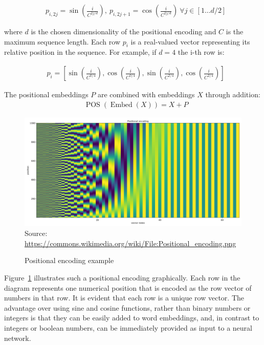 \begin{align}
&p_{i, 2j} = \sin \left( \frac{i}{C^{2j/d}} \right), \ p_{i, 2j+1} = \cos \left( \frac{i}{C^{2j/d}} \right) \ \forall j \in [1 \ldots d/2]  \label{eq:pos_encoding}
\end{align}

where $d$ is the chosen dimensionality of the positional encoding and  $C$ is the maximum sequence length. Each row $p_i$ is a real-valued vector representing its relative position in the sequence. For example, if $d=4$ the i-th row is:

\begin{align*}
&p_i = [ \sin(\frac{i}{C^{0/4}}), \cos(\frac{i}{C^{0/4}}), \sin(\frac{i}{C^{2/4}}), \cos(\frac{i}{C^{2/4}}) ]
\end{align*}

The positional embeddings $P$ are combined with embeddings $X$ through addition:
\begin{align}
&\operatorname{POS}(\operatorname{Embed}(X)) = X + P \label{eq:pos_encoding2}
\end{align}

\begin{figure}
\begin{center}
\includegraphics[width=.8\textwidth]{Positional_encoding.png} \\

\scriptsize Source: \url{https://commons.wikimedia.org/wiki/File:Positional_encoding.png} \normalsize
\end{center}
\caption{Positional encoding example}
\label{fig:positional_encoding}
\end{figure}

Figure~\ref{fig:positional_encoding} illustrates such a positional encoding graphically. Each row in the diagram represents one numerical position that is encoded as the row vector of numbers in that row. It is evident that each row is a unique row vector. The advantage over using sine and cosine functions, rather than binary numbers or integers is that they can be easily added to word embeddings, and, in contrast to integers or boolean numbers, can be immediately provided as input to a neural network. 

